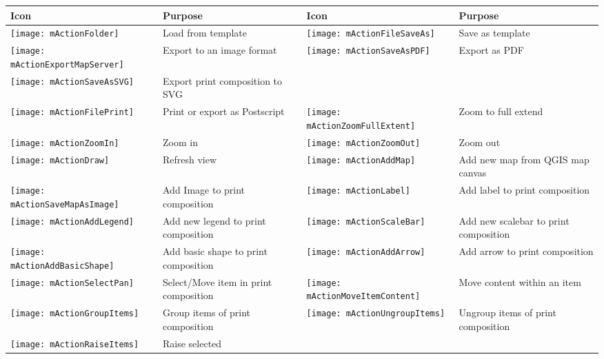 \begin{table}[h]
\centering\small
\renewcommand{\arraystretch}{2}
 \begin{tabular}{|m{1cm}|m{5.4cm}|m{1cm}|m{5.4cm}|}
 \hline \textbf{Icon} & \textbf{Purpose} & \textbf{Icon} &
 \textbf{Purpose} \\
 \hline \texttt{[image: mActionFolder]}
 & Load from template &
 \texttt{[image: mActionFileSaveAs]} & Save as template \\
 \hline \texttt{[image: mActionExportMapServer]}
 & Export to an image format &
 \texttt{[image: mActionSaveAsPDF]} & Export as PDF \\
 \hline \texttt{[image: mActionSaveAsSVG]} & Export print
 composition to SVG & & \\
 \hline \texttt{[image: mActionFilePrint]} & Print or 
 export as Postscript &
 \texttt{[image: mActionZoomFullExtent]} & Zoom to
 full extend \\
 \hline \texttt{[image: mActionZoomIn]} & Zoom in &
 \texttt{[image: mActionZoomOut]} & Zoom out \\
 \hline \texttt{[image: mActionDraw]} & Refresh 
 view &
 \texttt{[image: mActionAddMap]} & Add 
 new map from QGIS map canvas \\
 \hline \texttt{[image: mActionSaveMapAsImage]} & Add Image to 
 print composition &
 \texttt{[image: mActionLabel]} & Add label to print composition \\
 \hline \texttt{[image: mActionAddLegend]} & Add new legend to 
 print composition & 
 \texttt{[image: mActionScaleBar]} & Add new scalebar to print
 composition\\
 \hline \texttt{[image: mActionAddBasicShape]} & Add basic shape to
 print composition &
 \texttt{[image: mActionAddArrow]} & Add arrow to print
 composition\\
 \hline \texttt{[image: mActionSelectPan]} & Select/Move item in 
 print composition &
 \texttt{[image: mActionMoveItemContent]} & Move content within
 an item \\
 \hline \texttt{[image: mActionGroupItems]} & Group items of 
 print composition & 
 \texttt{[image: mActionUngroupItems]} & Ungroup items of print 
 composition \\
 \hline \texttt{[image: mActionRaiseItems]} & Raise selected

\end{tabular}
\end{table}
